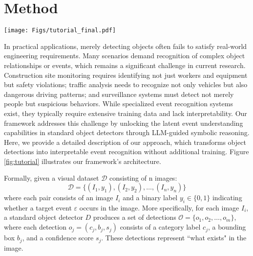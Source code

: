 \section{Method}
\label{sec:method}
%
\begin{figure*}[t!]
    \centering
    \setlength{\abovecaptionskip}{0.1cm}
    \texttt{[image: Figs/tutorial\_final.pdf]}
    \caption{\textbf{Illustration of the proposed \underline{SymbolicDet}}. SymbolicDet mainly consists of logic search and symbolic reasoning. The former module constructs and explores the search space by leveraging structured entity features extracted from an open-set object detector. Th latter module harnesses the symbolic reasoning capabilities of Large Language Models (LLMs) along with their inherent commonsense understanding of visual event patterns to guide the search process toward more appropriate and rational pathways.}
    \label{fig:tutorial}
    \vspace{-0.5cm}
\end{figure*}
%
In practical applications, merely detecting objects often fails to satisfy real-world engineering requirements. Many scenarios demand recognition of complex object relationships or events, which remains a significant challenge in current research. Construction site monitoring requires identifying not just workers and equipment but safety violations; traffic analysis needs to recognize not only vehicles but also dangerous driving patterns; and surveillance systems must detect not merely people but suspicious behaviors. While specialized event recognition systems exist, they typically require extensive training data and lack interpretability.
Our framework addresses this challenge by unlocking the latent event understanding capabilities in standard object detectors through LLM-guided symbolic reasoning. Here, we provide a detailed description of our approach, which transforms object detections into interpretable event recognition without additional training. Figure \ref{fig:tutorial} illustrates our framework's architecture. \par
Formally, given a visual dataset $\mathcal{D}$ consisting of n images:
\begin{equation}
    \mathcal{D} = \{\left(I_{1},y_{1} \right), \left(I_{2},y_{2} \right), \ldots, \left(I_{n},y_{n} \right)\}
\end{equation}
where each pair consists of an image \(I_i\) and a binary label \(y_i \in \{0, 1\}\) indicating whether a target event \(\varepsilon\) occurs in the image. More specifically, for each image \(I_i\), a standard object detector \(D\) produces a set of detections \(\mathcal{O} = \{o_1, o_2, \ldots, o_m\}\), where each detection \(o_j = (c_j, b_j, s_j)\) consists of a category label \(c_j\), a bounding box \(b_j\), and a confidence score \(s_j\). These detections represent ``what exists" in the image.
